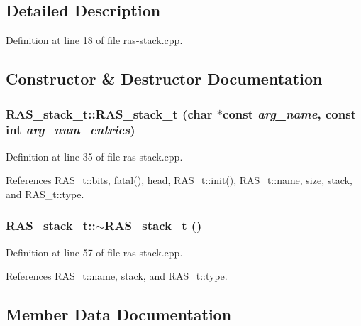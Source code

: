 \subsection{Detailed Description}


Definition at line 18 of file ras-stack.cpp.

\subsection{Constructor \& Destructor Documentation}
\subsubsection[{RAS\_\-stack\_\-t}]{\setlength{\rightskip}{0pt plus 5cm}RAS\_\-stack\_\-t::RAS\_\-stack\_\-t (char $\ast$const  {\em arg\_\-name}, \/  const int {\em arg\_\-num\_\-entries})\hspace{0.3cm}{\tt  [inline]}}\label{classRAS__stack__t_659d357a08ac30f13bf83993dd61bc1b}




Definition at line 35 of file ras-stack.cpp.

References RAS\_\-t::bits, fatal(), head, RAS\_\-t::init(), RAS\_\-t::name, size, stack, and RAS\_\-t::type.
\subsubsection[{$\sim$RAS\_\-stack\_\-t}]{\setlength{\rightskip}{0pt plus 5cm}RAS\_\-stack\_\-t::$\sim$RAS\_\-stack\_\-t ()\hspace{0.3cm}{\tt  [inline]}}\label{classRAS__stack__t_567f7b63162e12c15c783cb999b5e9c1}




Definition at line 57 of file ras-stack.cpp.

References RAS\_\-t::name, stack, and RAS\_\-t::type.

\subsection{Member Data Documentation}
